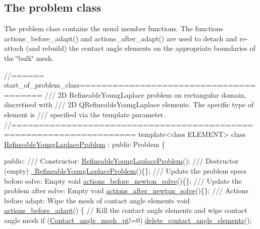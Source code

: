  

\hypertarget{index_class}{}\subsection{The problem class}\label{index_class}
The problem class contains the usual member functions. The functions {\ttfamily actions\+\_\+before\+\_\+adapt()} and {\ttfamily actions\+\_\+after\+\_\+adapt()} are used to detach and re-\/attach (and rebuild) the contact angle elements on the appropriate boundaries of the \char`\"{}bulk\char`\"{} mesh.

 
\begin{DoxyCodeInclude}
\textcolor{comment}{//====== start\_of\_problem\_class=======================================}
\textcolor{comment}{/// 2D RefineableYoungLaplace problem on rectangular domain, discretised with}
\textcolor{comment}{}\textcolor{comment}{/// 2D QRefineableYoungLaplace elements. The specific type of element is}
\textcolor{comment}{}\textcolor{comment}{/// specified via the template parameter.}
\textcolor{comment}{}\textcolor{comment}{//====================================================================}
\textcolor{keyword}{template}<\textcolor{keyword}{class} ELEMENT> 
\textcolor{keyword}{class }\hyperlink{classRefineableYoungLaplaceProblem}{RefineableYoungLaplaceProblem} : \textcolor{keyword}{public} Problem
\{

\textcolor{keyword}{public}:
\textcolor{comment}{}
\textcolor{comment}{ /// Constructor: }
\textcolor{comment}{} \hyperlink{classRefineableYoungLaplaceProblem_a78f77a299f2770a82378fcccf86a0b71}{RefineableYoungLaplaceProblem}();
\textcolor{comment}{}
\textcolor{comment}{ /// Destructor (empty)}
\textcolor{comment}{} \hyperlink{classRefineableYoungLaplaceProblem_a24b45d5ecdd1d7dbb678e7f74777bf41}{~RefineableYoungLaplaceProblem}()\{\};
\textcolor{comment}{}
\textcolor{comment}{ /// Update the problem specs before solve: Empty}
\textcolor{comment}{} \textcolor{keywordtype}{void} \hyperlink{classRefineableYoungLaplaceProblem_a2807bb8cddbfa553df9f5dd170c8645d}{actions\_before\_newton\_solve}()\{\};
\textcolor{comment}{}
\textcolor{comment}{ /// Update the problem after solve: Empty}
\textcolor{comment}{} \textcolor{keywordtype}{void} \hyperlink{classRefineableYoungLaplaceProblem_a0791c90a16016372e09faf3f5721ecbe}{actions\_after\_newton\_solve}()\{\};
\textcolor{comment}{}
\textcolor{comment}{ /// Actions before adapt: Wipe the mesh of contact angle elements}
\textcolor{comment}{} \textcolor{keywordtype}{void} \hyperlink{classRefineableYoungLaplaceProblem_ab64eb0b58beb3bb096ecc81b1a3f8a4f}{actions\_before\_adapt}()
  \{
   \textcolor{comment}{// Kill the contact angle elements and wipe contact angle mesh}
   \textcolor{keywordflow}{if} (\hyperlink{classRefineableYoungLaplaceProblem_a36f5dc0f7071ac15fd63c7c477f77fb0}{Contact\_angle\_mesh\_pt}!=0) 
      \hyperlink{classRefineableYoungLaplaceProblem_aaa270ba8da395897a5a99d052f076e0c}{delete\_contact\_angle\_elements}();


\end{DoxyCodeInclude}
